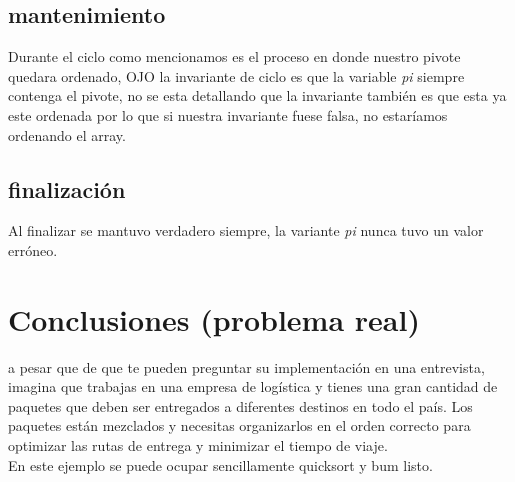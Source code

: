 \documentclass{article}
\begin{document}
\subsection*{mantenimiento}
Durante el ciclo como mencionamos es el proceso en donde nuestro pivote quedara ordenado, OJO la invariante de ciclo es
que la variable \textit{pi} siempre contenga el pivote, no se esta detallando que la invariante también es que esta ya este ordenada
por lo que si nuestra invariante fuese falsa, no estaríamos ordenando el array.
\subsection*{finalización}
Al finalizar se mantuvo verdadero siempre, la variante \textit{pi} nunca tuvo un valor erróneo.
\section{Conclusiones (problema real)}\label{Conclusiones}				%
  a pesar que de que te pueden preguntar su implementación en una entrevista,
  imagina que trabajas en una empresa de logística y tienes una gran cantidad de paquetes que deben ser entregados a diferentes destinos en todo el país. Los paquetes están mezclados y necesitas organizarlos en el orden correcto para optimizar las rutas de entrega y minimizar el tiempo de viaje. 
  \\
  En este ejemplo se puede ocupar sencillamente quicksort y bum listo.
\end{document}
